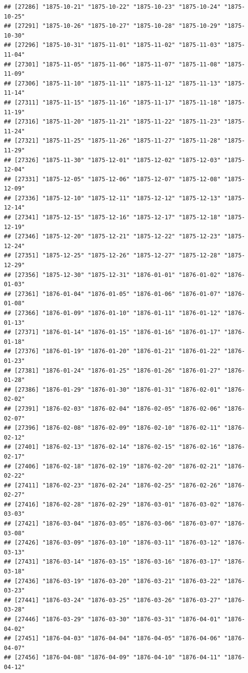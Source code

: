 \documentclass{article}\usepackage[]{graphicx}\usepackage[]{color}
\makeatletter
\newenvironment{kframe}{%
 \def\at@end@of@kframe{}%
 \ifinner\ifhmode%
  \def\at@end@of@kframe{\end{minipage}}%
  \begin{minipage}{\columnwidth}%
 \fi\fi%
 \def\FrameCommand##1{\hskip\@totalleftmargin \hskip-\fboxsep
 \colorbox{shadecolor}{##1}\hskip-\fboxsep
     \hskip-\linewidth \hskip-\@totalleftmargin \hskip\columnwidth}%
 \MakeFramed {\advance\hsize-\width
   \@totalleftmargin\z@ \linewidth\hsize
   \@setminipage}}%
 {\par\unskip\endMakeFramed%
 \at@end@of@kframe}
\newenvironment{knitrout}{}{} %
\makeatother
\begin{document}
\begin{description}
\begin{knitrout}
\begin{kframe}
\begin{verbatim}
## [27286] "1875-10-21" "1875-10-22" "1875-10-23" "1875-10-24" "1875-10-25"
## [27291] "1875-10-26" "1875-10-27" "1875-10-28" "1875-10-29" "1875-10-30"
## [27296] "1875-10-31" "1875-11-01" "1875-11-02" "1875-11-03" "1875-11-04"
## [27301] "1875-11-05" "1875-11-06" "1875-11-07" "1875-11-08" "1875-11-09"
## [27306] "1875-11-10" "1875-11-11" "1875-11-12" "1875-11-13" "1875-11-14"
## [27311] "1875-11-15" "1875-11-16" "1875-11-17" "1875-11-18" "1875-11-19"
## [27316] "1875-11-20" "1875-11-21" "1875-11-22" "1875-11-23" "1875-11-24"
## [27321] "1875-11-25" "1875-11-26" "1875-11-27" "1875-11-28" "1875-11-29"
## [27326] "1875-11-30" "1875-12-01" "1875-12-02" "1875-12-03" "1875-12-04"
## [27331] "1875-12-05" "1875-12-06" "1875-12-07" "1875-12-08" "1875-12-09"
## [27336] "1875-12-10" "1875-12-11" "1875-12-12" "1875-12-13" "1875-12-14"
## [27341] "1875-12-15" "1875-12-16" "1875-12-17" "1875-12-18" "1875-12-19"
## [27346] "1875-12-20" "1875-12-21" "1875-12-22" "1875-12-23" "1875-12-24"
## [27351] "1875-12-25" "1875-12-26" "1875-12-27" "1875-12-28" "1875-12-29"
## [27356] "1875-12-30" "1875-12-31" "1876-01-01" "1876-01-02" "1876-01-03"
## [27361] "1876-01-04" "1876-01-05" "1876-01-06" "1876-01-07" "1876-01-08"
## [27366] "1876-01-09" "1876-01-10" "1876-01-11" "1876-01-12" "1876-01-13"
## [27371] "1876-01-14" "1876-01-15" "1876-01-16" "1876-01-17" "1876-01-18"
## [27376] "1876-01-19" "1876-01-20" "1876-01-21" "1876-01-22" "1876-01-23"
## [27381] "1876-01-24" "1876-01-25" "1876-01-26" "1876-01-27" "1876-01-28"
## [27386] "1876-01-29" "1876-01-30" "1876-01-31" "1876-02-01" "1876-02-02"
## [27391] "1876-02-03" "1876-02-04" "1876-02-05" "1876-02-06" "1876-02-07"
## [27396] "1876-02-08" "1876-02-09" "1876-02-10" "1876-02-11" "1876-02-12"
## [27401] "1876-02-13" "1876-02-14" "1876-02-15" "1876-02-16" "1876-02-17"
## [27406] "1876-02-18" "1876-02-19" "1876-02-20" "1876-02-21" "1876-02-22"
## [27411] "1876-02-23" "1876-02-24" "1876-02-25" "1876-02-26" "1876-02-27"
## [27416] "1876-02-28" "1876-02-29" "1876-03-01" "1876-03-02" "1876-03-03"
## [27421] "1876-03-04" "1876-03-05" "1876-03-06" "1876-03-07" "1876-03-08"
## [27426] "1876-03-09" "1876-03-10" "1876-03-11" "1876-03-12" "1876-03-13"
## [27431] "1876-03-14" "1876-03-15" "1876-03-16" "1876-03-17" "1876-03-18"
## [27436] "1876-03-19" "1876-03-20" "1876-03-21" "1876-03-22" "1876-03-23"
## [27441] "1876-03-24" "1876-03-25" "1876-03-26" "1876-03-27" "1876-03-28"
## [27446] "1876-03-29" "1876-03-30" "1876-03-31" "1876-04-01" "1876-04-02"
## [27451] "1876-04-03" "1876-04-04" "1876-04-05" "1876-04-06" "1876-04-07"
## [27456] "1876-04-08" "1876-04-09" "1876-04-10" "1876-04-11" "1876-04-12"

\end{verbatim}
\end{kframe}
\end{knitrout}
\end{description}
\end{document}
